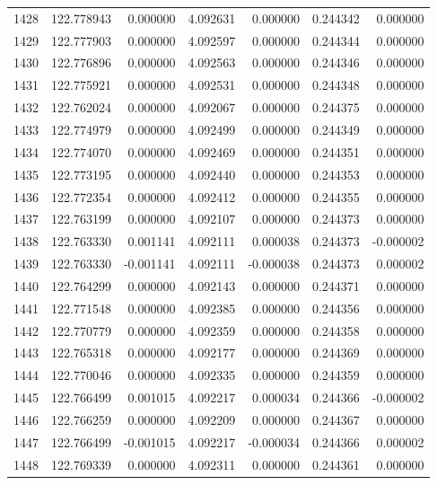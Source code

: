 \begin{tabular}{rrrrrrr}
1428 & 122.778943 &    0.000000 &  4.092631 &   0.000000 &   0.244342 &  0.000000 \\
1429 & 122.777903 &    0.000000 &  4.092597 &   0.000000 &   0.244344 &  0.000000 \\
1430 & 122.776896 &    0.000000 &  4.092563 &   0.000000 &   0.244346 &  0.000000 \\
1431 & 122.775921 &    0.000000 &  4.092531 &   0.000000 &   0.244348 &  0.000000 \\
1432 & 122.762024 &    0.000000 &  4.092067 &   0.000000 &   0.244375 &  0.000000 \\
1433 & 122.774979 &    0.000000 &  4.092499 &   0.000000 &   0.244349 &  0.000000 \\
1434 & 122.774070 &    0.000000 &  4.092469 &   0.000000 &   0.244351 &  0.000000 \\
1435 & 122.773195 &    0.000000 &  4.092440 &   0.000000 &   0.244353 &  0.000000 \\
1436 & 122.772354 &    0.000000 &  4.092412 &   0.000000 &   0.244355 &  0.000000 \\
1437 & 122.763199 &    0.000000 &  4.092107 &   0.000000 &   0.244373 &  0.000000 \\
1438 & 122.763330 &    0.001141 &  4.092111 &   0.000038 &   0.244373 & -0.000002 \\
1439 & 122.763330 &   -0.001141 &  4.092111 &  -0.000038 &   0.244373 &  0.000002 \\
1440 & 122.764299 &    0.000000 &  4.092143 &   0.000000 &   0.244371 &  0.000000 \\
1441 & 122.771548 &    0.000000 &  4.092385 &   0.000000 &   0.244356 &  0.000000 \\
1442 & 122.770779 &    0.000000 &  4.092359 &   0.000000 &   0.244358 &  0.000000 \\
1443 & 122.765318 &    0.000000 &  4.092177 &   0.000000 &   0.244369 &  0.000000 \\
1444 & 122.770046 &    0.000000 &  4.092335 &   0.000000 &   0.244359 &  0.000000 \\
1445 & 122.766499 &    0.001015 &  4.092217 &   0.000034 &   0.244366 & -0.000002 \\
1446 & 122.766259 &    0.000000 &  4.092209 &   0.000000 &   0.244367 &  0.000000 \\
1447 & 122.766499 &   -0.001015 &  4.092217 &  -0.000034 &   0.244366 &  0.000002 \\
1448 & 122.769339 &    0.000000 &  4.092311 &   0.000000 &   0.244361 &  0.000000 \\

\end{tabular}
